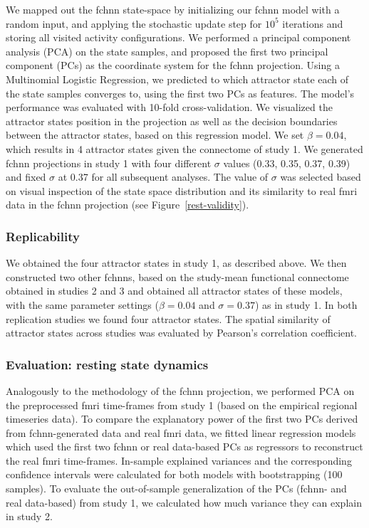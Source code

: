 \documentclass{article}
\begin{document}
We mapped out the \acrshort{fchnn} state-space by initializing our \acrshort{fchnn} model with a random input, and applying the stochastic update step for $10^5$ iterations and storing all visited activity configurations.
We performed a principal component analysis (PCA) on the state samples, and proposed the first two principal component (PCs) as the coordinate system for the \acrshort{fchnn} projection. Using a Multinomial Logistic Regression, we predicted to which attractor state each of the state samples converges to, using the first two PCs as features. The model's performance was evaluated with 10-fold cross-validation. We visualized the attractor states position in the projection as well as the decision boundaries between the attractor states, based on this regression model. We set $\beta = 0.04$, which results in 4 attractor states given the connectome of study 1. We generated \acrshort{fchnn} projections in study 1 with four different $\sigma$ values (0.33, 0.35, 0.37, 0.39) and fixed $\sigma$ at 0.37 for all subsequent analyses. The value of $\sigma$ was selected based on visual inspection of the state space distribution and its similarity to real \acrshort{fmri} data in the \acrshort{fchnn} projection (see Figure~\ref{rest-validity}).

\subsubsection{Replicability}

We obtained the four attractor states in study 1, as described above. We then constructed two other \acrshort{fchnn}s, based on the study-mean functional connectome obtained in studies 2 and 3 and  obtained all attractor states of these models, with the same parameter settings ($\beta = 0.04$ and $\sigma = 0.37$) as in study 1. In both replication studies we found four attractor states. The spatial similarity of attractor states across studies was evaluated by Pearson's correlation coefficient.

\subsubsection{Evaluation: resting state dynamics}

Analogously to the methodology of the \acrshort{fchnn} projection, we performed PCA on the preprocessed \acrshort{fmri} time-frames from study 1 (based on the empirical regional timeseries data).
To compare the explanatory power of the first two PCs derived from \acrshort{fchnn}-generated data and real \acrshort{fmri} data, we fitted linear regression models which used the first two \acrshort{fchnn} or real data-based PCs as regressors to reconstruct the real \acrshort{fmri} time-frames. In-sample explained variances and the corresponding confidence intervals were calculated for both models with bootstrapping (100 samples). To evaluate the out-of-sample generalization of the PCs (\acrshort{fchnn}- and real data-based) from study 1, we calculated how much variance they can explain in study 2.
\end{document}
